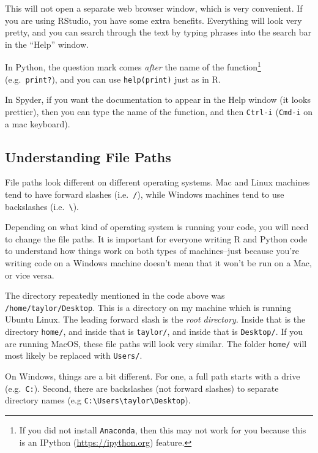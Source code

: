 \documentclass[
  12pt,
  krantz2]{krantz}
\begin{document}
This will not open a separate web browser window, which is very convenient. If you are using RStudio, you have some extra benefits. Everything will look very pretty, and you can search through the text by typing phrases into the search bar in the ``Help'' window.

In Python, the question mark comes \emph{after} the name of the function\footnote{If you did not install \texttt{Anaconda}, then this may not work for you because this is an IPython (\url{https://ipython.org}) feature.} (e.g.~\texttt{print?}), and you can use \texttt{help(print)} just as in R.

In Spyder, if you want the documentation to appear in the Help window (it looks prettier), then you can type the name of the function, and then \texttt{Ctrl-i} (\texttt{Cmd-i} on a mac keyboard).

\hypertarget{understanding-file-paths}{%
\subsection{Understanding File Paths}\label{understanding-file-paths}}

File paths look different on different operating systems. Mac and Linux machines tend to have forward slashes (i.e.~\texttt{/}), while Windows machines tend to use backslashes (i.e.~\texttt{\textbackslash{}}).

Depending on what kind of operating system is running your code, you will need to change the file paths. It is important for everyone writing R and Python code to understand how things work on both types of machines--just because you're writing code on a Windows machine doesn't mean that it won't be run on a Mac, or vice versa.

The directory repeatedly mentioned in the code above was \texttt{/home/taylor/Desktop}. This is a directory on my machine which is running Ubuntu Linux. The leading forward slash is the \emph{root directory}. Inside that is the directory \texttt{home/}, and inside that is \texttt{taylor/}, and inside that is \texttt{Desktop/}. If you are running MacOS, these file paths will look very similar. The folder \texttt{home/} will most likely be replaced with \texttt{Users/}.

On Windows, things are a bit different. For one, a full path starts with a drive (e.g.~\texttt{C:}). Second, there are backslashes (not forward slashes) to separate directory names (e.g \texttt{C:\textbackslash{}Users\textbackslash{}taylor\textbackslash{}Desktop}).
\end{document}
